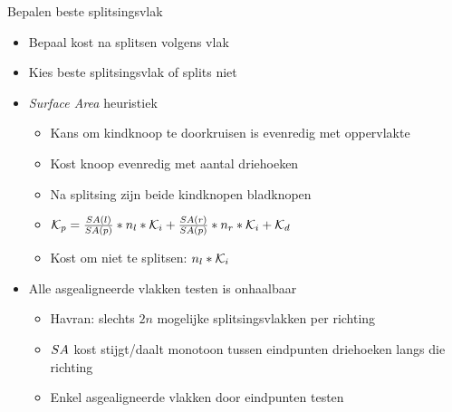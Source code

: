 \documentclass[11pt,t]{beamer}
\begin{document}
\begin{frame}{Bepalen beste splitsingsvlak}
	\begin{itemize}
	\item Bepaal kost na splitsen volgens vlak
	\item Kies beste splitsingsvlak of splits niet
	\item \textit{Surface Area} heuristiek
		\begin{itemize}
			\item Kans om kindknoop te doorkruisen is evenredig met oppervlakte
			\item Kost knoop evenredig met aantal driehoeken
			\item Na splitsing zijn beide kindknopen bladknopen
			\item $\mathcal{K}_p = \frac{SA(l)}{SA(p)}*n_l*\mathcal{K}_i + \frac{SA(r)}{SA(p)}*n_r*\mathcal{K}_i + \mathcal{K}_d$
			\item Kost om niet te splitsen: $n_l*\mathcal{K}_i$
		\end{itemize}
	\item Alle asgealigneerde vlakken testen is onhaalbaar
		\begin{itemize}
			\item Havran: slechts $2n$ mogelijke splitsingsvlakken per richting
			\item $SA$ kost stijgt/daalt monotoon tussen eindpunten driehoeken langs die richting
			\item Enkel asgealigneerde vlakken door eindpunten testen
		\end{itemize}
	\end{itemize}
\end{frame}
\end{document}
